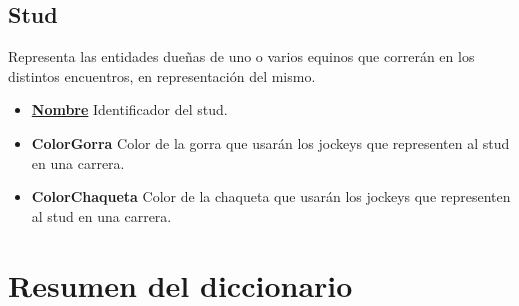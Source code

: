\documentclass[a4paper,11pt]{article}
\begin{document}
\subsection{Stud}

Representa las entidades dueñas de uno o varios equinos que correrán en los distintos
 encuentros, en representación del mismo.

\begin{itemize}

	\item \textbf{\uline{Nombre}} Identificador del stud.
	
	\item \textbf{ColorGorra} Color de la gorra que usarán los jockeys que 
	representen al stud en una carrera.
	
	\item \textbf{ColorChaqueta} Color de la chaqueta que usarán los jockeys 
	que representen al stud en una carrera.
	
\end{itemize}


\section{Resumen del diccionario}
\end{document}
